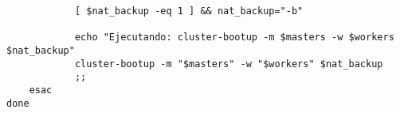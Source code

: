 \begin{verbatim}
            [ $nat_backup -eq 1 ] && nat_backup="-b"

            echo "Ejecutando: cluster-bootup -m $masters -w $workers $nat_backup"
            cluster-bootup -m "$masters" -w "$workers" $nat_backup
            ;;
    esac
done
\end{verbatim}